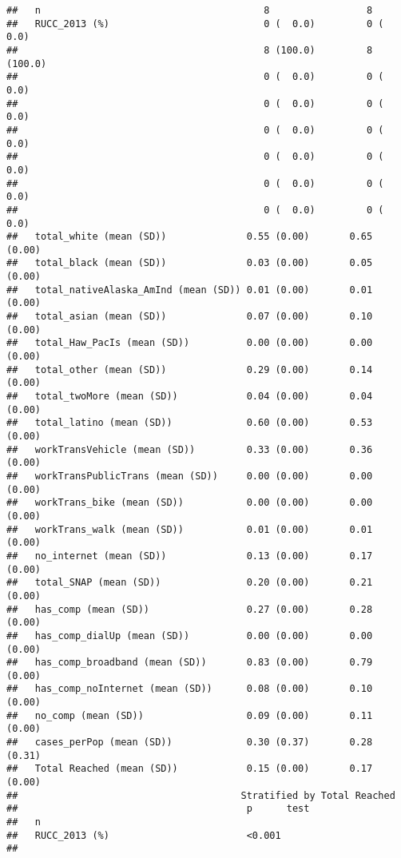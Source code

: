 \documentclass[
]{article}
\begin{document}
\begin{verbatim}
##   n                                       8                 8             
##   RUCC_2013 (%)                           0 (  0.0)         0 (  0.0)     
##                                           8 (100.0)         8 (100.0)     
##                                           0 (  0.0)         0 (  0.0)     
##                                           0 (  0.0)         0 (  0.0)     
##                                           0 (  0.0)         0 (  0.0)     
##                                           0 (  0.0)         0 (  0.0)     
##                                           0 (  0.0)         0 (  0.0)     
##                                           0 (  0.0)         0 (  0.0)     
##   total_white (mean (SD))              0.55 (0.00)       0.65 (0.00)      
##   total_black (mean (SD))              0.03 (0.00)       0.05 (0.00)      
##   total_nativeAlaska_AmInd (mean (SD)) 0.01 (0.00)       0.01 (0.00)      
##   total_asian (mean (SD))              0.07 (0.00)       0.10 (0.00)      
##   total_Haw_PacIs (mean (SD))          0.00 (0.00)       0.00 (0.00)      
##   total_other (mean (SD))              0.29 (0.00)       0.14 (0.00)      
##   total_twoMore (mean (SD))            0.04 (0.00)       0.04 (0.00)      
##   total_latino (mean (SD))             0.60 (0.00)       0.53 (0.00)      
##   workTransVehicle (mean (SD))         0.33 (0.00)       0.36 (0.00)      
##   workTransPublicTrans (mean (SD))     0.00 (0.00)       0.00 (0.00)      
##   workTrans_bike (mean (SD))           0.00 (0.00)       0.00 (0.00)      
##   workTrans_walk (mean (SD))           0.01 (0.00)       0.01 (0.00)      
##   no_internet (mean (SD))              0.13 (0.00)       0.17 (0.00)      
##   total_SNAP (mean (SD))               0.20 (0.00)       0.21 (0.00)      
##   has_comp (mean (SD))                 0.27 (0.00)       0.28 (0.00)      
##   has_comp_dialUp (mean (SD))          0.00 (0.00)       0.00 (0.00)      
##   has_comp_broadband (mean (SD))       0.83 (0.00)       0.79 (0.00)      
##   has_comp_noInternet (mean (SD))      0.08 (0.00)       0.10 (0.00)      
##   no_comp (mean (SD))                  0.09 (0.00)       0.11 (0.00)      
##   cases_perPop (mean (SD))             0.30 (0.37)       0.28 (0.31)      
##   Total Reached (mean (SD))            0.15 (0.00)       0.17 (0.00)      
##                                       Stratified by Total Reached
##                                        p      test
##   n                                               
##   RUCC_2013 (%)                        <0.001     
##                                                   

\end{verbatim}
\end{document}
